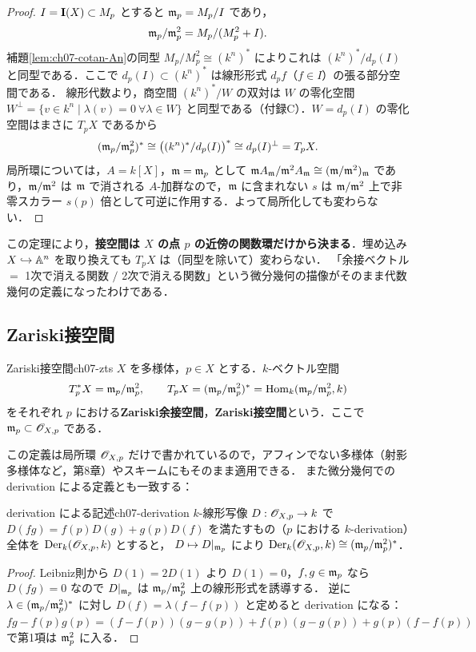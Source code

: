 \begin{proof}
$I=\mathbf{I}(X)\subset M_p$ とすると $\mathfrak{m}_p=M_p/I$ であり，
\[
  \mathfrak{m}_p/\mathfrak{m}_p^2=M_p/(M_p^2+I).
\]
補題\ref{lem:ch07-cotan-An}の同型 $M_p/M_p^2\cong(k^n)^*$ によりこれは $(k^n)^*/d_p(I)$ と同型である．ここで $d_p(I)\subset(k^n)^*$ は線形形式 $d_pf$（$f\in I$）の張る部分空間である．
線形代数より，商空間 $(k^n)^*/W$ の双対は $W$ の零化空間 $W^\perp=\{v\in k^n\mid \lambda(v)=0\ \forall\lambda\in W\}$ と同型である（付録C）．$W=d_p(I)$ の零化空間はまさに $T_pX$ であるから
\[
  (\mathfrak{m}_p/\mathfrak{m}_p^2)^*\cong\bigl((k^n)^*/d_p(I)\bigr)^*\cong d_p(I)^\perp=T_pX.
\]
局所環については，$A=k[X]$，$\mathfrak{m}=\mathfrak{m}_p$ として $\mathfrak{m} A_{\mathfrak{m}}/\mathfrak{m}^2A_{\mathfrak{m}}\cong(\mathfrak{m}/\mathfrak{m}^2)_{\mathfrak{m}}$ であり，$\mathfrak{m}/\mathfrak{m}^2$ は $\mathfrak{m}$ で消される $A$-加群なので，$\mathfrak{m}$ に含まれない $s$ は $\mathfrak{m}/\mathfrak{m}^2$ 上で非零スカラー $s(p)$ 倍として可逆に作用する．よって局所化しても変わらない．
\end{proof}

この定理により，\textbf{接空間は $X$ の点 $p$ の近傍の関数環だけから決まる}．埋め込み $X\hookrightarrow\mathbb{A}^n$ を取り換えても $T_pX$ は（同型を除いて）変わらない．
「余接ベクトル $=$ 1次で消える関数 $/$ 2次で消える関数」という微分幾何の描像がそのまま代数幾何の定義になったわけである．

\subsection{Zariski接空間}

\begin{mydef}{Zariski接空間}{ch07-zts}
$X$ を多様体，$p\in X$ とする．$k$-ベクトル空間
\[
  T_p^*X=\mathfrak{m}_p/\mathfrak{m}_p^2,\qquad T_pX=(\mathfrak{m}_p/\mathfrak{m}_p^2)^*=\operatorname{Hom}_k(\mathfrak{m}_p/\mathfrak{m}_p^2,k)
\]
をそれぞれ $p$ における\textbf{Zariski余接空間}，\textbf{Zariski接空間}という．ここで $\mathfrak{m}_p\subset\mathscr{O}_{X,p}$ である．
\end{mydef}

この定義は局所環 $\mathscr{O}_{X,p}$ だけで書かれているので，アフィンでない多様体（射影多様体など，第8章）やスキームにもそのまま適用できる．
また微分幾何での derivation による定義とも一致する：

\begin{myprop}{derivation による記述}{ch07-derivation}
$k$-線形写像 $D:\mathscr{O}_{X,p}\to k$ で $D(fg)=f(p)D(g)+g(p)D(f)$ を満たすもの（$p$ における $k$-derivation）全体を $\operatorname{Der}_k(\mathscr{O}_{X,p},k)$ とすると，
$D\mapsto D|_{\mathfrak{m}_p}$ により $\operatorname{Der}_k(\mathscr{O}_{X,p},k)\cong(\mathfrak{m}_p/\mathfrak{m}_p^2)^*$．
\end{myprop}

\begin{proof}
Leibniz則から $D(1)=2D(1)$ より $D(1)=0$，$f,g\in\mathfrak{m}_p$ なら $D(fg)=0$ なので $D|_{\mathfrak{m}_p}$ は $\mathfrak{m}_p/\mathfrak{m}_p^2$ 上の線形形式を誘導する．
逆に $\lambda\in(\mathfrak{m}_p/\mathfrak{m}_p^2)^*$ に対し $D(f)=\lambda(f-f(p))$ と定めると derivation になる：$fg-f(p)g(p)=(f-f(p))(g-g(p))+f(p)(g-g(p))+g(p)(f-f(p))$ で第1項は $\mathfrak{m}_p^2$ に入る．
\end{proof}

